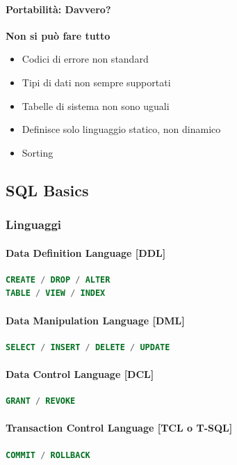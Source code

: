 \documentclass[12pt,a4paper]{article}
\begin{document}
\paragraph{Portabilità: Davvero?}
\begin{center}\textbf{Non si può fare tutto}\end{center}
\begin{itemize}
\item Codici di errore non standard
\item Tipi di dati non sempre supportati
\item Tabelle di sistema non sono uguali
\item Definisce solo linguaggio statico, non dinamico
\item Sorting
\end{itemize}

\subsection{SQL Basics}
\subsubsection{Linguaggi}
\paragraph{Data Definition Language [DDL]}
\flushleft
\begin{lstlisting}[language = SQL]
CREATE / DROP / ALTER 
TABLE / VIEW / INDEX
\end{lstlisting}

\paragraph{Data Manipulation Language [DML]}
\flushleft
\begin{lstlisting}[language = SQL]
SELECT / INSERT / DELETE / UPDATE
\end{lstlisting}

\paragraph{Data Control Language [DCL]}
\flushleft
\begin{lstlisting}[language = SQL]
GRANT / REVOKE
\end{lstlisting}

\paragraph{Transaction Control Language [TCL o T-SQL]}
\flushleft
\begin{lstlisting}[language = SQL]
COMMIT / ROLLBACK
\end{lstlisting}
\end{document}
